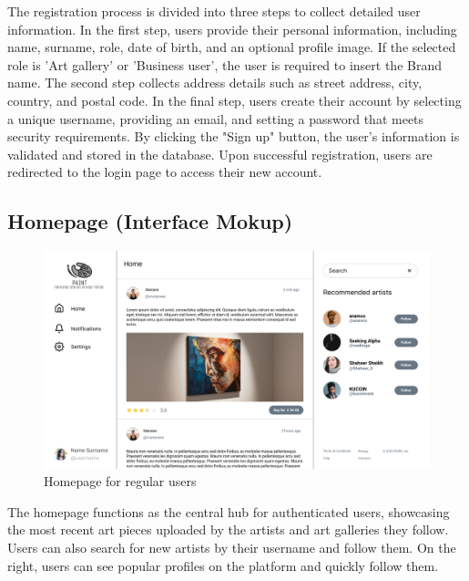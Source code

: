 The registration process is divided into three steps to collect detailed user information. 
In the first step, users provide their personal information, including name, surname, role, date of birth, and an optional profile image. If the selected role is 'Art gallery' or 'Business user', the user is required to insert the Brand name. 
The second step collects address details such as street address, city, country, and postal code. 
In the final step, users create their account by selecting a unique username, providing an email, and setting a password that meets security requirements.
By clicking the "Sign up" button, the user's information is validated and stored in the database.
Upon successful registration, users are redirected to the login page to access their new account.

\subsection{Homepage (Interface Mokup)}
\begin{figure}[H]
    \centering
    \includegraphics[width=\myfigwidth]{images/interface_mockups/Home - regular users.pdf}
    \caption{Homepage for regular users}
\end{figure}

The homepage functions as the central hub for authenticated users, showcasing the most recent art pieces uploaded by the artists and art galleries they follow.
Users can also search for new artists by their username and follow them. 
On the right, users can see popular profiles on the platform and quickly follow them.

